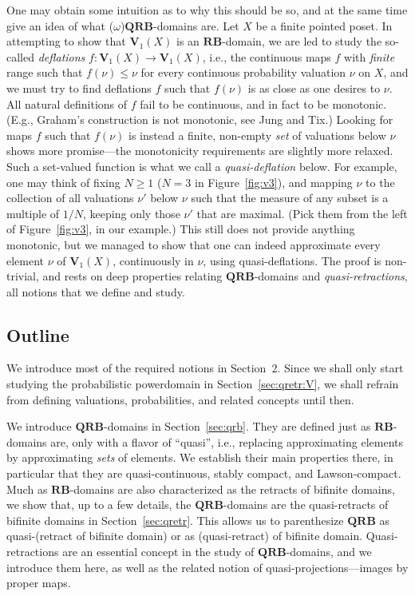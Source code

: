 \documentclass{LMCS}
\newcommand\QRB{\mathbf{QRB}}
\newcommand\RB{\mathbf{RB}}
\newcommand\Val{\mathbf V}
\begin{document}
One may obtain some intuition as to why this should be so, and at the
same time give an idea of what ($\omega$)$\QRB$-domains are.  Let $X$
be a finite pointed poset.  In attempting to show that $\Val_1 (X)$ is
an $\RB$-domain, we are led to study the so-called {\em deflations\/}
$f : \Val_1 (X) \to \Val_1 (X)$, i.e., the continuous maps $f$ with
{\em finite\/} range such that $f (\nu) \leq \nu$ for every continuous
probability valuation $\nu$ on $X$, and we must try to find deflations
$f$ such that $f (\nu)$ is as close as one desires to $\nu$.  All
natural definitions of $f$ fail to be continuous, and in fact to be
monotonic.  (E.g., Graham's construction \cite{Graham:rb:V} is not
monotonic, see Jung and Tix.)  Looking for maps $f$ such that $f
(\nu)$ is instead a finite, non-empty {\em set\/} of valuations below
$\nu$ shows more promise---the monotonicity requirements are slightly
more relaxed.  Such a set-valued function is what we call a {\em
  quasi-deflation\/} below.  For example, one may think of fixing $N
\geq 1$ ($N=3$ in Figure~\ref{fig:v3}), and mapping $\nu$ to the
collection of all valuations $\nu'$ below $\nu$ such that the measure
of any subset is a multiple of $1/N$, keeping only those $\nu'$ that
are maximal.  (Pick them from the left of Figure~\ref{fig:v3}, in our
example.)  This still does not provide anything monotonic, but we
managed to show that one can indeed approximate every element $\nu$ of
$\Val_1 (X)$, continuously in $\nu$, using quasi-deflations.  The
proof is non-trivial, and rests on deep properties relating
$\QRB$-domains and \emph{quasi-retractions}, all notions that we
define and study.



\subsection{Outline}

We introduce most of the required notions in Section~2.  Since we
shall only start studying the probabilistic powerdomain in
Section~\ref{sec:qretr:V}, we shall refrain from defining valuations,
probabilities, and related concepts until then.

We introduce $\QRB$-domains in Section~\ref{sec:qrb}.  They are
defined just as $\RB$-domains are, only with a flavor of ``quasi'',
i.e., replacing approximating elements by approximating {\em sets\/}
of elements.  We establish their main properties there, in particular
that they are quasi-continuous, stably compact, and Lawson-compact.
Much as $\RB$-domains are also characterized as the retracts of
bifinite domains, we show that, up to a few details, the
$\QRB$-domains are the quasi-retracts of bifinite domains in
Section~\ref{sec:qretr}.  This allows us to parenthesize $\QRB$ as
quasi-(retract of bifinite domain) or as (quasi-retract) of bifinite
domain.  Quasi-retractions are an essential concept in the study of
$\QRB$-domains, and we introduce them here, as well as the related
notion of quasi-projections---images by proper maps.
\end{document}
